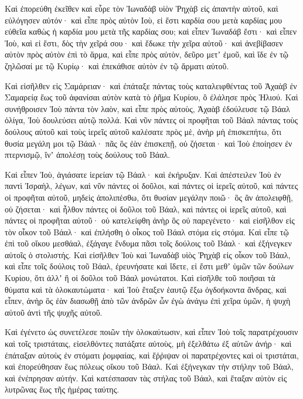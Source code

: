 {\par }{\PP {}Καὶ ἐπορεύθη ἐκεῖθεν καὶ εὗρε τὸν Ἰωναδὰβ υἱὸν Ῥηχὰβ εἰς ἀπαντὴν αὐτοῦ, καὶ εὐλόγησεν αὐτόν· καὶ εἶπε πρὸς αὐτὸν Ιοὺ, εἰ ἔστι καρδία σου μετὰ καρδίας μου εὐθεῖα καθὼς ἡ καρδία μου μετὰ τῆς καρδίας σου; καὶ εἶπεν Ἰωναδάβ ἔστι· καὶ εἶπεν Ἰοὺ, καὶ εἰ ἔστι, δὸς τὴν χεῖρά σου· καὶ ἔδωκε τὴν χεῖρα αὐτοῦ· καὶ ἀνεβίβασεν αὐτὸν πρὸς αὐτὸν ἐπὶ τὸ ἅρμα,
καὶ εἶπε πρὸς αὐτὸν, δεῦρο μετʼ ἐμοῦ, καὶ ἴδε ἐν τῷ ζηλῶσαί με τῷ Κυρίῳ· καὶ ἐπεκάθισε αὐτὸν ἐν τῷ ἅρματι αὐτοῦ.
\par }{\PP {}Καὶ εἰσῆλθεν εἰς Σαμάρειαν· καὶ ἐπάταξε πάντας τοὺς καταλειφθέντας τοῦ Ἀχαὰβ ἐν Σαμαρείᾳ ἕως τοῦ ἀφανίσαι αὐτὸν κατὰ τὸ ῥῆμα Κυρίου, ὃ ἐλάλησε πρὸς Ἠλιού.
Καὶ συνήθροισεν Ἰοὺ πάντα τὸν λαὸν, καὶ εἶπε πρὸς αὐτοὺς, Ἀχαὰβ ἐδούλευσε τῷ Βάαλ ὀλίγα, Ἰοὺ δουλεύσει αὐτῷ πολλά.
Καὶ νῦν πάντες οἱ προφῆται τοῦ Βάαλ πάντας τοὺς δούλους αὐτοῦ καὶ τοὺς ἱερεῖς αὐτοῦ καλέσατε πρὸς μὲ, ἀνὴρ μὴ ἐπισκεπήτω, ὅτι θυσία μεγάλη μοι τῷ Βάαλ· πᾶς ὃς ἐὰν ἐπισκεπῇ, οὐ ζήσεται· καὶ Ἰοὺ ἐποίησεν ἐν πτερνισμῷ, ἵνʼ ἀπολέσῃ τοὺς δούλους τοῦ Βάαλ.
\par }{\PP {}Καὶ εἶπεν Ἰοὺ, ἁγιάσατε ἱερείαν τῷ Βάαλ· καὶ ἐκήρυξαν.
Καὶ ἀπέστειλεν Ἰοὺ ἐν παντὶ Ἰσραὴλ, λέγων, καὶ νῦν πάντες οἱ δοῦλοι, καὶ πάντες οἱ ἱερεῖς αὐτοῦ, καὶ πάντες οἱ προφῆται αὐτοῦ, μηδεὶς ἀπολιπέσθω, ὅτι θυσίαν μεγάλην ποιῶ· ὃς ἂν ἀπολειφθῇ, οὐ ζήσεται· καὶ ἦλθον πάντες οἱ δοῦλοι τοῦ Βάαλ, καὶ πάντες οἱ ἱερεῖς αὐτοῦ, καὶ πάντες οἱ προφῆται αὐτοῦ· οὐ κατελείφθη ἀνὴρ ὃς οὐ παρεγένετο· καὶ εἰσῆλθον εἰς τὸν οἶκον τοῦ Βάαλ· καὶ ἐπλήσθη ὁ οἶκος τοῦ Βάαλ στόμα εἰς στόμα.
Καὶ εἶπε τῷ ἐπὶ τοῦ οἴκου μεσθάαλ, ἐξάγαγε ἔνδυμα πᾶσι τοῖς δούλοις τοῦ Βάαλ· καὶ ἐξήνεγκεν αὐτοῖς ὁ στολιστής.
Καὶ εἰσῆλθεν Ἰοὺ καὶ Ἰωναδὰβ υἱὸς Ῥηχὰβ εἰς οἶκον τοῦ Βάαλ, καὶ εἶπε τοῖς δούλοις τοῦ Βάαλ, ἐρευνήσατε καὶ ἴδετε, εἰ ἔστι μεθʼ ὑμῶν τῶν δούλων Κυρίου, ὅτι ἀλλʼ ἢ οἱ δοῦλοι τοῦ Βάαλ μονώτατοι.
Καὶ εἰσῆλθε τοῦ ποιῆσαι τὰ θύματα καὶ τὰ ὁλοκαυτώματα· καὶ Ἰοὺ ἔταξεν ἑαυτῷ ἔξω ὀγδοήκοντα ἄνδρας, καὶ εἶπεν, ἀνὴρ ὃς ἐὰν διασωθῇ ἀπὸ τῶν ἀνδρῶν ὧν ἐγὼ ἀνάγω ἐπὶ χεῖρα ὑμῶν, ἡ ψυχὴ αὐτοῦ ἀντὶ τῆς ψυχῆς αὐτοῦ.
\par }{\PP {}Καὶ ἐγένετο ὡς συνετέλεσε ποιῶν τὴν ὁλοκαύτωσιν, καὶ εἶπεν Ἰοὺ τοῖς παρατρέχουσιν καὶ τοῖς τριστάταις, εἰσελθόντες πατάξατε αὐτοὺς, μὴ ἐξελθάτω ἐξ αὐτῶν ἀνήρ· καὶ ἐπάταξαν αὐτοὺς ἐν στόματι ῥομφαίας, καὶ ἔῤῥιψαν οἱ παρατρέχοντες καὶ οἱ τριστάται, καὶ ἐπορεύθησαν ἕως πόλεως οἴκου τοῦ Βάαλ.
Καὶ ἐξήνεγκαν τὴν στήλην τοῦ Βάαλ, καὶ ἐνέπρησαν αὐτήν.
Καὶ κατέσπασαν τὰς στήλας τοῦ Βάαλ, καὶ ἔταξαν αὐτὸν εἰς λυτρῶνας ἕως τῆς ἡμέρας ταύτης.
}
